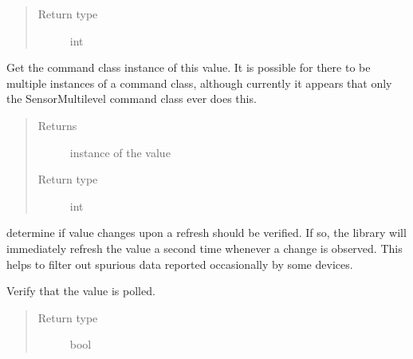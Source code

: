 \documentclass[letterpaper,10pt,english]{sphinxmanual}
\begin{document}
\begin{fulllineitems}
\begin{fulllineitems}
\begin{quote}
\begin{description}
\item[{Return type}] \leavevmode
int

\end{description}\end{quote}

\end{fulllineitems}


\begin{fulllineitems}
\label{value:openzwave.value.ZWaveValue.instance}
Get the command class instance of this value.  It is possible for there to be
multiple instances of a command class, although currently it appears that
only the SensorMultilevel command class ever does this.
\begin{quote}\begin{description}
\item[{Returns}] \leavevmode
instance of the value

\item[{Return type}] \leavevmode
int

\end{description}\end{quote}

\end{fulllineitems}


\begin{fulllineitems}
\label{value:openzwave.value.ZWaveValue.is_change_verified}
determine if value changes upon a refresh should be verified.
If so, the library will immediately refresh the value a second time whenever a change is observed.
This helps to filter out spurious data reported occasionally by some devices.

\end{fulllineitems}


\begin{fulllineitems}
\label{value:openzwave.value.ZWaveValue.is_polled}
Verify that the value is polled.
\begin{quote}\begin{description}
\item[{Return type}] \leavevmode
bool


\end{description}
\end{quote}
\end{fulllineitems}
\end{fulllineitems}
\end{document}
